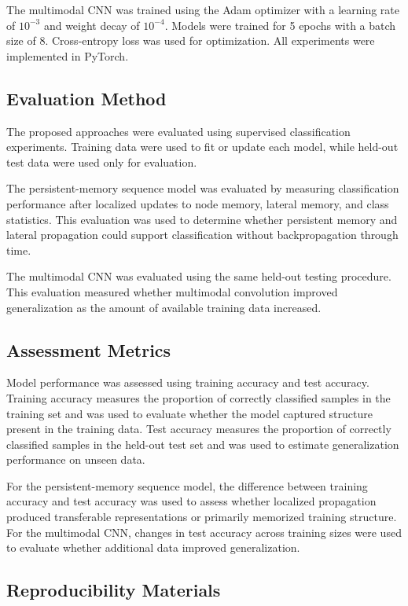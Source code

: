 \documentclass[lineno]{wlpeerj}
\begin{document}
The multimodal CNN was trained using the Adam optimizer with a learning rate of $10^{-3}$ and weight decay of $10^{-4}$. Models were trained for 5 epochs with a batch size of 8. Cross-entropy loss was used for optimization. All experiments were implemented in PyTorch.

\subsection{Evaluation Method}

The proposed approaches were evaluated using supervised classification experiments. Training data were used to fit or update each model, while held-out test data were used only for evaluation.

The persistent-memory sequence model was evaluated by measuring classification performance after localized updates to node memory, lateral memory, and class statistics. This evaluation was used to determine whether persistent memory and lateral propagation could support classification without backpropagation through time.

The multimodal CNN was evaluated using the same held-out testing procedure. This evaluation measured whether multimodal convolution improved generalization as the amount of available training data increased.
	
\subsection{Assessment Metrics}

Model performance was assessed using training accuracy and test accuracy. Training accuracy measures the proportion of correctly classified samples in the training set and was used to evaluate whether the model captured structure present in the training data. Test accuracy measures the proportion of correctly classified samples in the held-out test set and was used to estimate generalization performance on unseen data.

For the persistent-memory sequence model, the difference between training accuracy and test accuracy was used to assess whether localized propagation produced transferable representations or primarily memorized training structure. For the multimodal CNN, changes in test accuracy across training sizes were used to evaluate whether additional data improved generalization.
	
\subsection{Reproducibility Materials}
\end{document}
